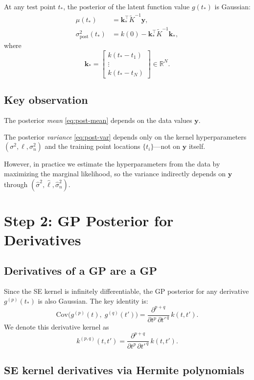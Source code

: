 \documentclass[11pt]{article}
\begin{document}
At any test point $t_*$, the posterior of the latent function value $g(t_*)$ is Gaussian:
\begin{align}
\mu(t_*) &= \mathbf{k}_*^\top \tilde{K}^{-1} \mathbf{y}, \label{eq:post-mean} \\
\sigma^2_{\mathrm{post}}(t_*) &= k(0) - \mathbf{k}_*^\top \tilde{K}^{-1} \mathbf{k}_*, \label{eq:post-var}
\end{align}
where
\[
\mathbf{k}_* = \begin{bmatrix} k(t_* - t_1) \\ \vdots \\ k(t_* - t_N) \end{bmatrix} \in \mathbb{R}^N.
\]

\subsection{Key observation}

The posterior \emph{mean} \eqref{eq:post-mean} depends on the data values $\mathbf{y}$.

The posterior \emph{variance} \eqref{eq:post-var} depends only on the kernel hyperparameters $(\sigma^2, \ell, \sigma_n^2)$ and the training point locations $\{t_i\}$---not on $\mathbf{y}$ itself.

However, in practice we estimate the hyperparameters from the data by maximizing the marginal likelihood, so the variance indirectly depends on $\mathbf{y}$ through $(\hat\sigma^2, \hat\ell, \hat\sigma_n^2)$.

\section{Step 2: GP Posterior for Derivatives}

\subsection{Derivatives of a GP are a GP}

Since the SE kernel is infinitely differentiable, the GP posterior for any derivative $g^{(p)}(t_*)$ is also Gaussian.
The key identity is:
\[
\mathrm{Cov}\bigl(g^{(p)}(t),\; g^{(q)}(t')\bigr)
=
\frac{\partial^{p+q}}{\partial t^p \,\partial t'^{\,q}}\, k(t, t').
\]
We denote this derivative kernel as
\[
k^{(p,q)}(t, t') = \frac{\partial^{p+q}}{\partial t^p \,\partial t'^{\,q}}\, k(t, t').
\]

\subsection{SE kernel derivatives via Hermite polynomials}
\end{document}
